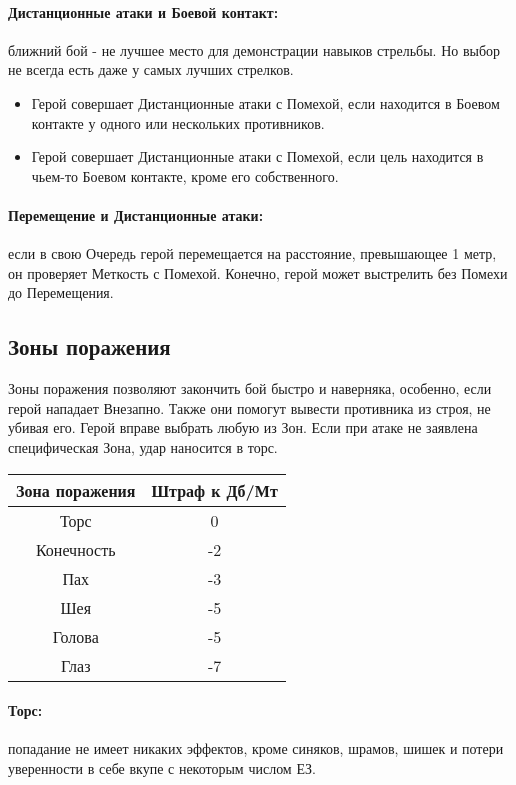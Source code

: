 \paragraph{Дистанционные атаки и Боевой контакт:} ближний бой - не лучшее место для демонстрации навыков стрельбы. Но выбор не всегда есть даже у самых лучших стрелков.
\begin{itemize}
  \item Герой совершает Дистанционные атаки с Помехой, если находится в Боевом контакте у одного или нескольких противников.
  \item Герой совершает Дистанционные атаки с Помехой, если цель находится в чьем-то Боевом контакте, кроме его собственного.
\end{itemize}
\paragraph{Перемещение и Дистанционные атаки:} если в свою Очередь герой перемещается на расстояние, превышающее 1 метр, он проверяет Меткость с Помехой. Конечно, герой может выстрелить без Помехи до Перемещения.
\subsection{Зоны поражения}
Зоны поражения позволяют закончить бой быстро и наверняка, особенно, если герой нападает Внезапно. Также они помогут вывести противника из строя, не убивая его.
\newline Герой вправе выбрать любую из Зон. Если при атаке не заявлена специфическая Зона, удар наносится в торс.
\begin{center} \begin{tabular}{|c|c|} \hline
  \textbf{Зона поражения} & \textbf{Штраф к Дб/Мт} \\ \hline
  Торс & 0 \\ \hline
  Конечность & -2 \\ \hline
  Пах & -3 \\ \hline
  Шея & -5 \\ \hline
  Голова & -5 \\ \hline
  Глаз & -7 \\ \hline
\end{tabular} \end{center}
\paragraph{Торс:} попадание не имеет никаких эффектов, кроме синяков, шрамов, шишек и потери уверенности в себе вкупе с некоторым числом ЕЗ. 
